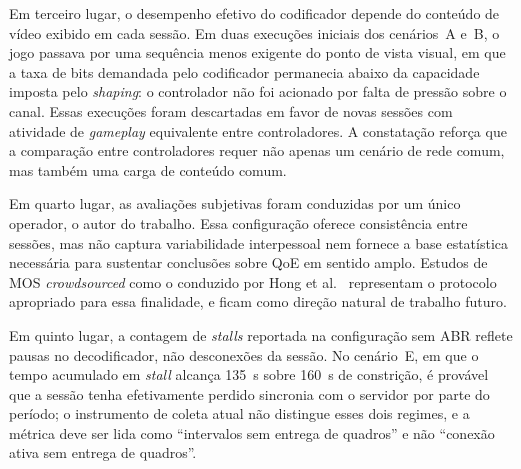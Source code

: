 Em terceiro lugar, o desempenho efetivo do codificador
depende do conteúdo de vídeo exibido em cada sessão. Em
duas execuções iniciais dos cenários~A e~B, o jogo passava
por uma sequência menos exigente do ponto de vista visual,
em que a taxa de bits demandada pelo codificador permanecia
abaixo da capacidade imposta pelo \emph{shaping}: o
controlador não foi acionado por falta de pressão sobre o
canal. Essas execuções foram descartadas em favor de novas
sessões com atividade de \emph{gameplay} equivalente entre
controladores. A constatação reforça que a comparação entre
controladores requer não apenas um cenário de rede comum,
mas também uma carga de conteúdo comum.

Em quarto lugar, as avaliações subjetivas foram conduzidas
por um único operador, o autor do trabalho. Essa configuração
oferece consistência entre sessões, mas não captura
variabilidade interpessoal nem fornece a base estatística
necessária para sustentar conclusões sobre QoE em sentido
amplo. Estudos de MOS \emph{crowdsourced} como o conduzido por
Hong et al.~\cite{hong2015} representam o protocolo apropriado
para essa finalidade, e ficam como direção natural de trabalho
futuro.

Em quinto lugar, a contagem de \emph{stalls} reportada na
configuração sem ABR reflete pausas no decodificador, não
desconexões da sessão. No cenário~E, em que o tempo
acumulado em \emph{stall} alcança \SI{135}{\second} sobre
\SI{160}{\second} de constrição, é provável que a sessão
tenha efetivamente perdido sincronia com o servidor por
parte do período; o instrumento de coleta atual não distingue
esses dois regimes, e a métrica deve ser lida como
``intervalos sem entrega de quadros'' e não ``conexão ativa
sem entrega de quadros''.
